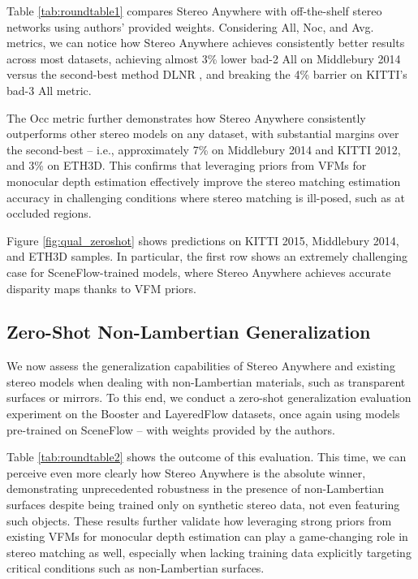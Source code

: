 \documentclass[10pt,twocolumn,letterpaper]{article}
\newcommand{\method}[0]{Stereo Anywhere\xspace}
\begin{document}
Table \ref{tab:roundtable1} compares \method with off-the-shelf stereo networks using authors' provided weights. Considering All, Noc, and Avg. metrics, we can notice how \method achieves consistently better results across most datasets, achieving almost 3\% lower bad-2 All on Middlebury 2014 versus the second-best method DLNR \cite{zhao2023high}, and breaking the 4\% barrier on KITTI's bad-3 All metric.

The Occ metric further demonstrates how \method{} consistently outperforms other stereo models on any dataset, with substantial margins over the second-best -- i.e., approximately 7\% on Middlebury 2014 and KITTI 2012, and 3\% on ETH3D. This confirms that leveraging priors from VFMs for monocular depth estimation effectively improve the stereo matching estimation accuracy in challenging conditions where stereo matching is ill-posed, such as at occluded regions.

Figure \ref{fig:qual_zeroshot} shows predictions on KITTI 2015, Middlebury 2014, and ETH3D samples. In particular, the first row shows an extremely challenging case for SceneFlow-trained models, where \method achieves accurate disparity maps thanks to VFM priors.


\phantom{Invisible Text}
\vspace{-\baselineskip}

\subsection{Zero-Shot Non-Lambertian Generalization}


We now assess the generalization capabilities of \method and existing stereo models when dealing with non-Lambertian materials, such as transparent surfaces or mirrors. To this end, we conduct a zero-shot generalization evaluation experiment on the Booster \cite{Ramirez_2022_CVPR} and LayeredFlow \cite{wen2024layeredflow} datasets, once again using models pre-trained on SceneFlow \cite{mayer2016large} -- with weights provided by the authors.

Table \ref{tab:roundtable2} shows the outcome of this evaluation. This time, we can perceive even more clearly how \method is the absolute winner, demonstrating unprecedented robustness in the presence of non-Lambertian surfaces despite being trained only on synthetic stereo data, not even featuring such objects. These results further validate how leveraging strong priors from existing VFMs for monocular depth estimation can play a game-changing role in stereo matching as well, especially when lacking training data explicitly targeting critical conditions such as non-Lambertian surfaces.
\end{document}
